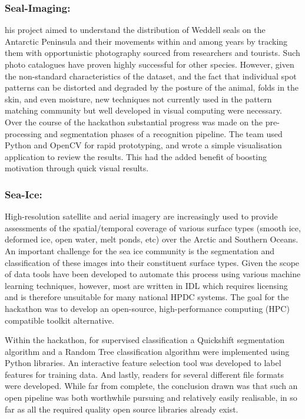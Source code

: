 \documentclass[conference]{IEEEtran}
\begin{document}
\subsubsection{Seal-Imaging:}his project aimed to understand the distribution of Weddell seals on the Antarctic Peninsula and their movements within and among years by tracking them with opportunistic photography sourced from researchers and tourists. Such photo catalogues have proven highly successful for other species.  However, given the non-standard characteristics of the dataset, and the fact that individual spot patterns can be distorted and degraded by the posture of the animal, folds in the skin, and even moisture, new techniques not currently used in the pattern matching community but well developed in visual computing were necessary.  Over the course of the hackathon substantial progress was made on the pre-processing and segmentation phases of a recognition pipeline.  The team used Python and OpenCV for rapid prototyping, and wrote a simple visualisation application to review the results.  This had the added benefit of boosting motivation through quick visual results.
\subsubsection{Sea-Ice:}
High-resolution satellite and aerial imagery are increasingly used to provide assessments of the spatial/temporal coverage of various surface types (smooth ice, deformed ice, open water, melt ponds, etc) over the Arctic and Southern Oceans. An important challenge for the sea ice community is the segmentation and classification of these images into their constituent surface types. Given the scope of data tools have been developed to automate this process using various machine learning techniques, however, most are written in IDL which requires licensing and is therefore unsuitable for many national HPDC systems. The goal for the hackathon was to develop an open-source, high-performance computing (HPC) compatible toolkit alternative.

Within the hackathon, for supervised classification a Quickshift segmentation algorithm and a Random Tree classification algorithm were implemented using Python libraries.  An interactive feature selection tool was developed to label features for training data.  And lastly, readers for several different file formats were developed.  While far from complete, the conclusion drawn was that such an open pipeline was both worthwhile pursuing and relatively easily realisable, in so far as all the required quality open source libraries already exist.
\end{document}
